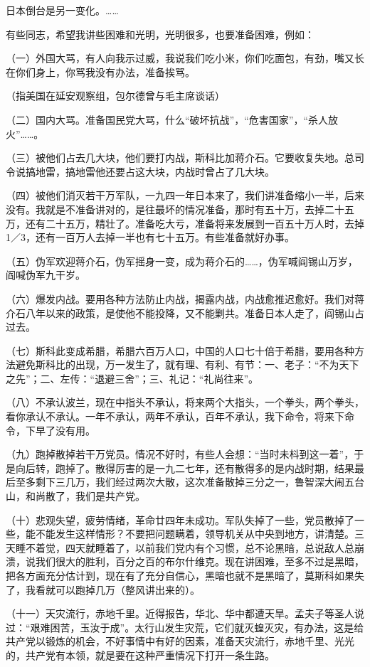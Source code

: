 日本倒台是另一变化。……

有些同志，希望我讲些困难和光明，光明很多，也要准备困难，例如：

（一）外国大骂，有人向我示过威，我说我们吃小米，你们吃面包，有劲，嘴又长在你们身上，你骂我没有办法，准备挨骂。

（指美国在延安观察组，包尔德曾与毛主席谈话）

（二）国内大骂。准备国民党大骂，什么“破坏抗战”，“危害国家”，“杀人放火”……。

（三）被他们占去几大块，他们要打内战，斯科比加蒋介石。它要收复失地。总司令说搞地雷，搞地雷他还要占这大块，内战时曾占了几大块。

（四）被他们消灭若干万军队，一九四一年日本来了，我们讲准备缩小一半，后来没有。我就是不准备讲对的，是往最坏的情况准备，那时有五十万，去掉二十五万，还有二十五万，精壮了。准备吃大亏，准备将来发展到一百五十万人时，去掉1／3，还有一百万人去掉一半也有七十五万。有些准备就好办事。

（五）伪军欢迎蒋介石，伪军摇身一变，成为蒋介石的……，伪军喊阎锡山万岁，阎喊伪军九干岁。

（六）爆发内战。要用各种方法防止内战，揭露内战，内战愈推迟愈好。我们对蒋介石八年以来的政策，是使他不能投降，又不能剿共。准备日本人走了，阎锡山占过去。

（七）斯科此变成希腊，希腊六百万人口，中国的人口七十倍于希腊，要用各种方法避免斯科比的出现，万一发生了，就有理、有利、有节：一、老子：“不为天下之先”；二、左传：“退避三舍”；三、礼记：“礼尚往来”。

（八）不承认波兰，现在中指头不承认，将来两个大指头，一个拳头，两个拳头，看你承认不承认。一年不承认，两年不承认，百年不承认，我下命令，将来下命令，下早了没有用。

（九）跑掉散掉若干万党员。情况不好时，有些人会想：“当时未枓到这一着”，于是向后转，跑掉了。散得厉害的是一九二七年，还有散得多的是内战时期，结果最后至多剩下三几万，我们经过两次大散，这次准备散掉三分之一，鲁智深大闹五台山，和尚散了，我们是共产党。

（十）悲观失望，疲劳情绪，革命廿四年未成功。军队失掉了一些，党员散掉了一些，能不能发生这样情形？不要把问题瞒着，领导机关从中央到地方，讲清楚。三天睡不着觉，四天就睡着了，以前我们党内有个习惯，总不论黑暗，总说敌人总崩溃，说我们很大的胜利，百分之百的布尔什维克。现在讲困难，至多不过是黑暗，把各方面充分估计到，现在有了充分自信心，黑暗也就不是黑暗了，莫斯科如果失了，我看就可以跑掉几万（整风讲出来的）。

（十一）天灾流行，赤地千里。近得报告，华北、华中都遭天旱。孟夫子等圣人说过：“艰难困苦，玉汝于成”。太行山发生灾荒，它们就灭蝗灭灾，有办法，这是给共产党以锻炼的机会，不好事情中有好的因素，准备天灾流行，赤地千里、光光的，共产党有本领，就是要在这种严重情况下打开一条生路。

